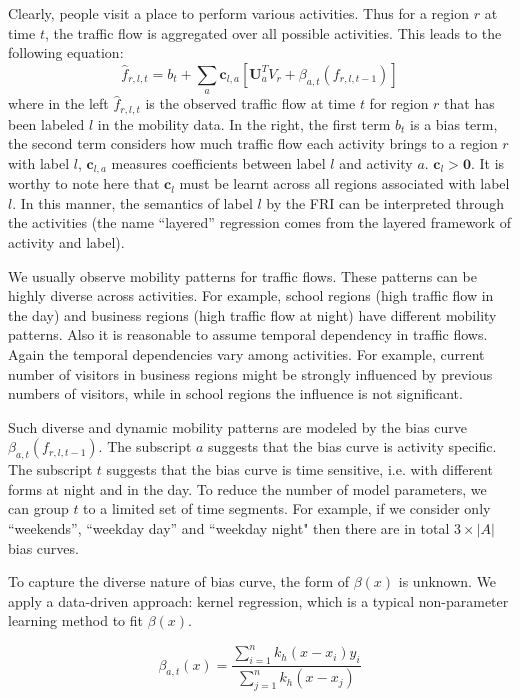 \documentclass[runningheads]{llncs}
\begin{document}
Clearly, people visit a place to perform various activities.
Thus for a region $r$ at time $t$, the traffic flow is aggregated over all possible activities. This leads to the following equation:
\begin{equation}
\hat{f}_{r,l,t}=b_t+\sum_{a} \mathbf{c}_{l,a} [\mathbf{U}_a^T V_r+  \beta_{a,t} (f_{r,l,t-1})] \label{equ:model}
\end{equation}
where in the left $\hat{f}_{r,l,t}$ is the observed traffic flow at time $t$ for region $r$ that has been labeled $l$ in the mobility data. In the right, the first term $b_t$ is a bias term, the second term considers how much traffic flow each activity brings to a region $r$ with label $l$, $\mathbf{c}_{l,a}$ measures coefficients between label $l$ and activity $a$. $\mathbf{c}_{l}>\mathbf{0}$. It is worthy to note here that $\mathbf{c}_l$ must be learnt across all regions associated with label $l$. In this manner, the semantics of label $l$ by the FRI can be interpreted through the activities (the name ``layered'' regression comes from the layered framework of activity and label).

We usually observe mobility patterns for traffic flows.
These patterns can be highly diverse across activities. 
For example, school regions (high traffic flow in the day) and business regions (high traffic flow at night) have different mobility patterns.
Also it is reasonable to assume temporal dependency in traffic flows.
Again the temporal dependencies vary among activities.
For example, current number of visitors in business regions might be strongly influenced by previous numbers of visitors, while in school regions the influence is not significant.  

Such diverse and dynamic mobility patterns are modeled by the bias curve $\beta_{a,t}(f_{r,l,t-1})$.
The subscript $a$ suggests that the bias curve is activity specific.
The subscript $t$ suggests that the bias curve is time sensitive, i.e. with different forms at night and in the day. To reduce the number of model parameters, we can group $t$ to a limited set of time segments. For example, if we consider only ``weekends'', ``weekday day''  and ``weekday night" then there are in total $3\times |A|$ bias curves. 

To capture the diverse nature of bias curve, the form of $\beta(x)$ is unknown.
We apply a data-driven approach: kernel regression, which is a typical non-parameter learning method to fit $\beta(x)$.

\begin{equation}\label{eqn:kernel}
\beta_{a,t} (x) = \frac{\sum_{i=1}^n k_h(x-x_i) y_i}{ \sum_{j=1}^n k_h(x-x_j)}
\end{equation}
\end{document}
